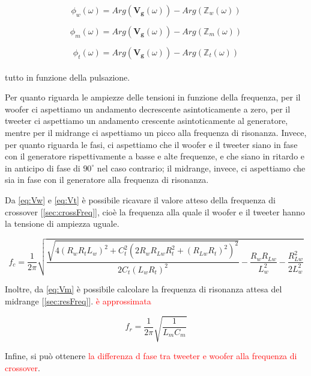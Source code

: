 \documentclass[12pt,italian]{article}
\newcommand{\err}[1]{\textcolor{red}{#1}}
\begin{document}
\begin{equation}
  \phi_{w}(\omega) = Arg(\mathbf{V_{g}}(\omega)) - Arg(\mathbb{Z}_{w}(\omega))
\end{equation}

\begin{equation}
  \phi_{m}(\omega) = Arg(\mathbf{V_{g}}(\omega)) - Arg(\mathbb{Z}_{m}(\omega))
\end{equation}

\begin{equation}
  \phi_{t}(\omega) =  Arg(\mathbf{V_{g}}(\omega)) - Arg(\mathbb{Z}_{t}(\omega))
\end{equation}
\\
tutto in funzione della pulsazione.

Per quanto riguarda le ampiezze delle tensioni in funzione della frequenza, per
il woofer ci aspettiamo un andamento decrescente asintoticamente a zero, per il
tweeter ci aspettiamo un andamento crescente asintoticamente al generatore,
mentre per il midrange ci aspettiamo un picco alla frequenza di risonanza.
Invece, per quanto riguarda le fasi, ci aspettiamo che il woofer e il tweeter
siano in fase con il generatore rispettivamente a basse e alte frequenze, e che
siano in ritardo e in anticipo di fase di $90^\circ$ nel caso contrario; il
midrange, invece, ci aspettiamo che sia in fase con il generatore alla
frequenza di risonanza.

Da \eqref{eq:Vw} e \eqref{eq:Vt} è possibile ricavare il valore atteso della
frequenza di crossover [\ref{sec:crossFreq}], cioè la frequenza alla quale il
woofer e il tweeter hanno la tensione di ampiezza uguale.

\begin{equation}
  f_{c} = \frac{1}{2\pi}\sqrt{\frac{\sqrt{4 (R_{w} R_{t} L_{w})^2 + C_{t}^2(2
        R_{w} R_{Lw} R_{t}^2 + (R_{Lw} R_{t})^2)^2}}{2 C _{t} (L_{w} R_{t})^2 } -
    \frac{R_{w} R_{Lw}}{L_{w}^2} - \frac{R_{Lw}^2}{2 L_{w}^2}}
  \label{eq:fc}
\end{equation}

\noindent
Inoltre, da \eqref{eq:Vm} è possibile calcolare la frequenza di risonanza attesa del midrange [\ref{sec:resFreq}].
\err{è approssimata}

\begin{equation}
  f_{r} = \frac{1}{2\pi}\sqrt{\frac{1}{L_{m} C_{m}}}  %
  \label{eq:fr}
\end{equation}

\noindent
Infine, si può ottenere \err{la differenza d fase tra tweeter e woofer alla frequenza di crossover}.
\end{document}
